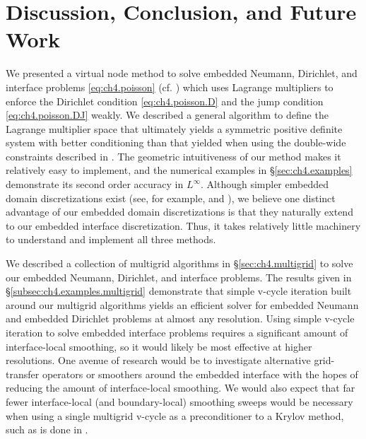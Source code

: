 \section{Discussion, Conclusion, and Future Work}

We presented a virtual node method to solve embedded Neumann, Dirichlet, and interface problems \eqref{eq:ch4.poisson} (cf. \cite{Bedrossian10}) which uses Lagrange multipliers to enforce the Dirichlet condition \eqref{eq:ch4.poisson.D} and the jump condition \eqref{eq:ch4.poisson.DJ} weakly. We described a general algorithm to define the Lagrange multiplier space that ultimately yields a symmetric positive definite system with better conditioning than that yielded when using the double-wide constraints described in \cite{Bedrossian10}. The geometric intuitiveness of our method makes it relatively easy to implement, and the numerical examples in \S\ref{sec:ch4.examples} demonstrate its second order accuracy in $L^{\infty}$. Although simpler embedded domain discretizations exist (see, for example, \cite{Gibou02} and \cite{Ng.YenTing09}), we believe one distinct advantage of our embedded domain discretizations is that they naturally extend to our embedded interface discretization. Thus, it takes relatively little machinery to understand and implement all three methods.

We described a collection of multigrid algorithms in \S\ref{sec:ch4.multigrid} to solve our embedded Neumann, Dirichlet, and interface problems. The results given in \S\ref{subsec:ch4.examples.multigrid} demonstrate that simple v-cycle iteration built around our multigrid algorithms yields an efficient solver for embedded Neumann and embedded Dirichlet problems at almost any resolution. Using simple v-cycle iteration to solve embedded interface problems requires a significant amount of interface-local smoothing, so it would likely be most effective at higher resolutions. One avenue of research would be to investigate alternative grid-transfer operators or smoothers around the embedded interface with the hopes of reducing the amount of interface-local smoothing. We would also expect that far fewer interface-local (and boundary-local) smoothing sweeps would be necessary when using a single multigrid v-cycle as a preconditioner to a Krylov method, such as is done in \cite{McAdams10}.
